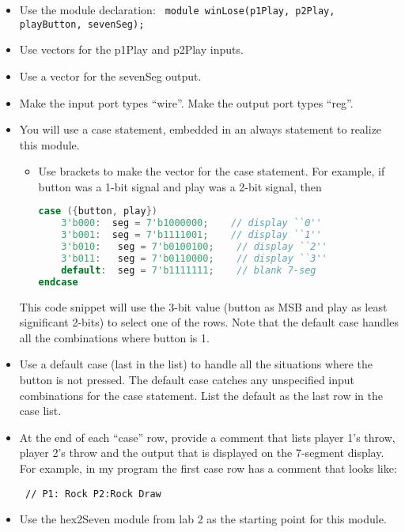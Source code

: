 \begin{itemize}
\item
  Use the module declaration:
\verb+ module winLose(p1Play, p2Play, playButton, sevenSeg);+

\item
  Use vectors for the p1Play and p2Play inputs.
\item
  Use a vector for the sevenSeg output.
\item
  Make the input port types ``wire''. Make the output port types  ``reg''.

\item
  You will use a case statement, embedded in an always statement to
  realize this module.

  \begin{itemize}
  \item
    Use brackets to make the vector for the case statement. For example,
    if button was a 1-bit signal and play was a 2-bit signal, then
    
\begin{lstlisting}[language=Verilog, frame=single]
case ({button, play})
    3'b000:  seg = 7'b1000000;    // display ``0''
    3'b001:  seg = 7'b1111001;    // display ``1''
    3'b010:   seg = 7'b0100100;    // display ``2''
    3'b011:   seg = 7'b0110000;    // display ``3''
    default:  seg = 7'b1111111;    // blank 7-seg
endcase
    \end{lstlisting}
    
  \end{itemize}

This code snippet will use the 3-bit value (button as MSB and play as
least significant 2-bits) to select one of the rows. Note that the
default case handles all the combinations where button is 1.

\item
  Use a default case (last in the list) to handle all the situations
  where the button is not pressed. The default case catches any
  unspecified input combinations for the case statement. List the
  default as the last row in the case list.
\item
  At the end of each ``case'' row, provide a comment that lists player
  1's throw, player 2's throw and the output that is displayed on the
  7-segment display. For example, in my program the first case row has a
  comment that looks like:

\verb+ // P1: Rock P2:Rock Draw +

\item
  Use the hex2Seven module from lab 2 as the starting point for this
  module.
\end{itemize}

